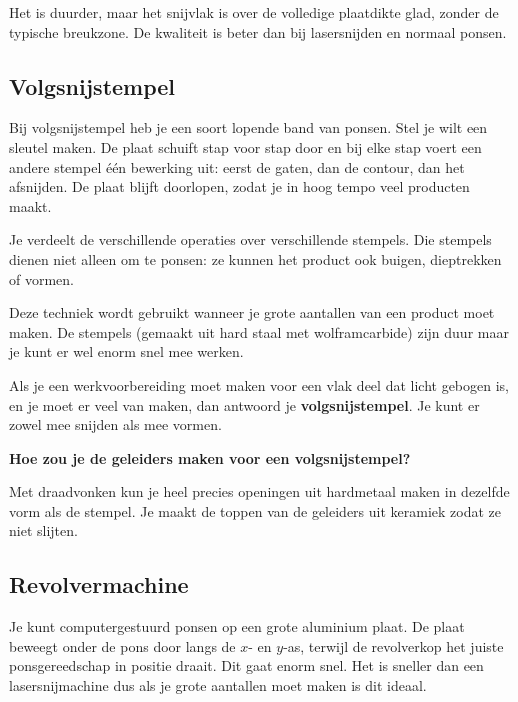 \documentclass[a4paper,11pt,twoside]{report}
\begin{document}
Het is duurder, maar het snijvlak is over de volledige plaatdikte glad, zonder de typische breukzone.
De kwaliteit is beter dan bij lasersnijden en normaal ponsen.

\subsection{Volgsnijstempel}

\begin{conceptbox}[Volgsnijstempel]
    Bij volgsnijstempel heb je een soort lopende band van ponsen.
    Stel je wilt een sleutel maken. De plaat schuift stap voor stap door en bij elke stap voert
    een andere stempel één bewerking uit: eerst de gaten, dan de contour, dan het afsnijden.
    De plaat blijft doorlopen, zodat je in hoog tempo veel producten maakt.
\end{conceptbox}

Je verdeelt de verschillende operaties over verschillende stempels.
Die stempels dienen niet alleen om te ponsen: ze kunnen het product ook buigen, dieptrekken of vormen.

Deze techniek wordt gebruikt wanneer je grote aantallen van een product moet maken.
De stempels (gemaakt uit hard staal met wolframcarbide) zijn duur maar je kunt er wel enorm snel mee werken.

\begin{examenbox}
    Als je een werkvoorbereiding moet maken voor een vlak deel dat licht gebogen is,
    en je moet er veel van maken, dan antwoord je \textbf{volgsnijstempel}.
    Je kunt er zowel mee snijden als mee vormen.
\end{examenbox}

\begin{warningbox}[Examenvraag]
    \textbf{Hoe zou je de geleiders maken voor een volgsnijstempel?}

    Met draadvonken kun je heel precies openingen uit hardmetaal maken in dezelfde vorm als de stempel.
    Je maakt de toppen van de geleiders uit keramiek zodat ze niet slijten.
\end{warningbox}

\subsection{Revolvermachine}

Je kunt computergestuurd ponsen op een grote aluminium plaat.
De plaat beweegt onder de pons door langs de $x$- en $y$-as, terwijl de revolverkop het juiste
ponsgereedschap in positie draait.
Dit gaat enorm snel.
Het is sneller dan een lasersnijmachine dus als je grote aantallen moet maken is dit ideaal.
\end{document}
